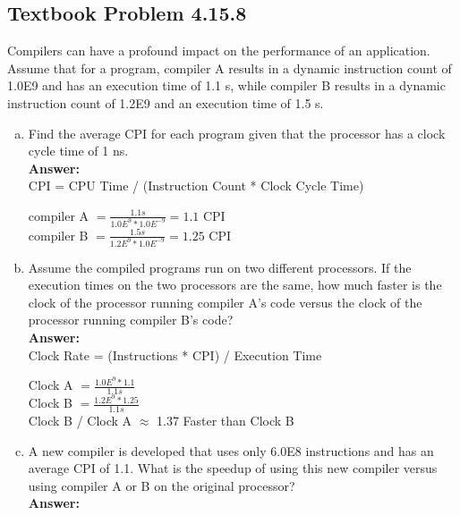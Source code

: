 \documentclass[12pt]{article}
\begin{document}
\subsection{Textbook Problem 4.15.8}
Compilers can have a profound impact on the performance of an application. Assume that for a program, compiler A results in a dynamic instruction count of 1.0E9 and has an execution time of 1.1 s, while compiler B results in a dynamic instruction count of 1.2E9 and an execution time of 1.5 s.

\begin{enumerate}[(a)]
    \item Find the average CPI for each program given that the processor has a clock cycle time of 1 ns.
    \\
    \textbf{Answer:}
    \\
    CPI = CPU Time / (Instruction Count * Clock Cycle Time)
        \begin{center}
            compiler A $ = \frac{1.1s}{1.0E^{9} * 1.0E^{-9}} = 1.1 \text{ CPI} $\\[0.25in]
            compiler B $ = \frac{1.5s}{1.2E^{9} * 1.0E^{-9}} = 1.25 \text{ CPI} $\\
        \end{center}
    
    \item Assume the compiled programs run on two different processors. If the execution times on the two processors are the same, how much faster is the clock of the processor running compiler A's code versus the clock of the processor running compiler B's code?
    \\
    \textbf{Answer:}
    \\
    Clock Rate = (Instructions * CPI) / Execution Time
        \begin{center}
            Clock A $ = \frac{1.0E^{9} * 1.1}{1.1s} $\\[0.25in]
            Clock B $ = \frac{1.2E^{9} * 1.25}{1.1s} $\\[0.25in]
            Clock B / Clock A $\approx$ 1.37 Faster than Clock B\\
        \end{center}
    
    \item A new compiler is developed that uses only 6.0E8 instructions and has an average CPI of 1.1. What is the speedup of using this new compiler versus using compiler A or B on the original processor?
    \\
    \textbf{Answer:}
    \\
    
\end{enumerate}
\end{document}
